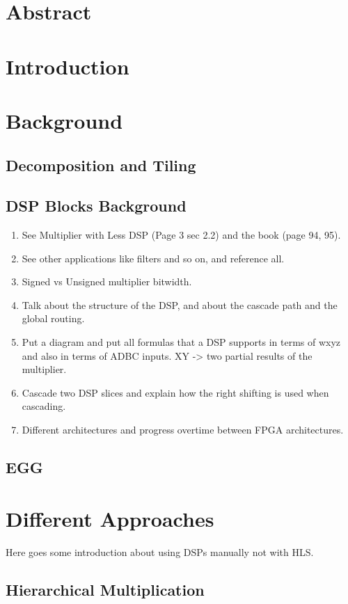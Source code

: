 \documentclass{article}
\begin{document}
\section{Abstract}
\section{Introduction}

\section{Background}
\subsection{Decomposition and Tiling}
\subsection{DSP Blocks Background}

\begin{enumerate}
    \item See Multiplier with Less DSP (Page 3 sec 2.2) and the book (page 94, 95).
    \item See other applications like filters and so on, and reference all.
    \item Signed vs Unsigned multiplier bitwidth. 
    \item Talk about the structure of the DSP, and about the cascade path and the global routing.
    \item Put a diagram and put all formulas that a DSP supports in terms of wxyz and also in terms of ADBC inputs. XY -> two partial results of the multiplier. 
    \item Cascade two DSP slices and explain how the right shifting is used when cascading. 
    \item Different architectures and progress overtime between FPGA architectures. 
\end{enumerate}

\subsection{EGG}


\section{Different Approaches}
Here goes some introduction about using DSPs manually not with HLS. 
\subsection{Hierarchical Multiplication}
\end{document}
